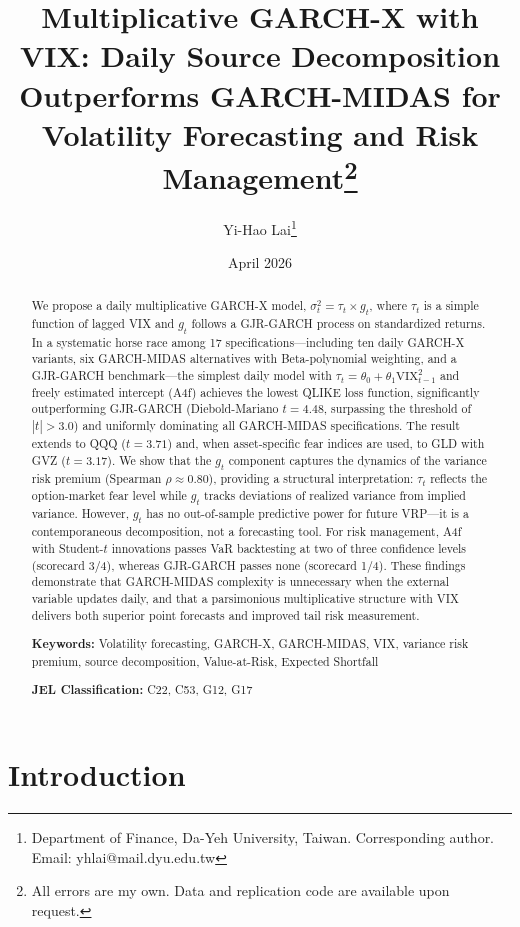 \documentclass[12pt,a4paper]{article}
\title{Multiplicative GARCH-X with VIX: Daily Source Decomposition Outperforms GARCH-MIDAS for Volatility Forecasting and Risk Management\thanks{All errors are my own. Data and replication code are available upon request.}}
\author{Yi-Hao Lai\thanks{Department of Finance, Da-Yeh University, Taiwan. Corresponding author. Email: yhlai@mail.dyu.edu.tw}}
\date{April 2026}
\begin{document}
\maketitle

\begin{abstract}
\noindent
We propose a daily multiplicative GARCH-X model, $\sigma_t^2 = \tau_t \times g_t$, where $\tau_t$ is a simple function of lagged VIX and $g_t$ follows a GJR-GARCH process on standardized returns. In a systematic horse race among 17 specifications---including ten daily GARCH-X variants, six GARCH-MIDAS alternatives with Beta-polynomial weighting, and a GJR-GARCH benchmark---the simplest daily model with $\tau_t = \theta_0 + \theta_1 \mathrm{VIX}_{t-1}^2$ and freely estimated intercept (A4f) achieves the lowest QLIKE loss function, significantly outperforming GJR-GARCH (Diebold-Mariano $t = 4.48$, surpassing the \citet{harvey2016} threshold of $|t| > 3.0$) and uniformly dominating all GARCH-MIDAS specifications. The result extends to QQQ ($t = 3.71$) and, when asset-specific fear indices are used, to GLD with GVZ ($t = 3.17$). We show that the $g_t$ component captures the dynamics of the variance risk premium (Spearman $\rho \approx 0.80$), providing a structural interpretation: $\tau_t$ reflects the option-market fear level while $g_t$ tracks deviations of realized variance from implied variance. However, $g_t$ has no out-of-sample predictive power for future VRP---it is a contemporaneous decomposition, not a forecasting tool. For risk management, A4f with Student-$t$ innovations passes VaR backtesting at two of three confidence levels (scorecard 3/4), whereas GJR-GARCH passes none (scorecard 1/4). These findings demonstrate that GARCH-MIDAS complexity is unnecessary when the external variable updates daily, and that a parsimonious multiplicative structure with VIX delivers both superior point forecasts and improved tail risk measurement.

\medskip
\noindent
\textbf{Keywords:} Volatility forecasting, GARCH-X, GARCH-MIDAS, VIX, variance risk premium, source decomposition, Value-at-Risk, Expected Shortfall

\medskip
\noindent
\textbf{JEL Classification:} C22, C53, G12, G17
\end{abstract}

\newpage
\tableofcontents
\newpage

\section{Introduction}
\label{sec:intro}
\end{document}
